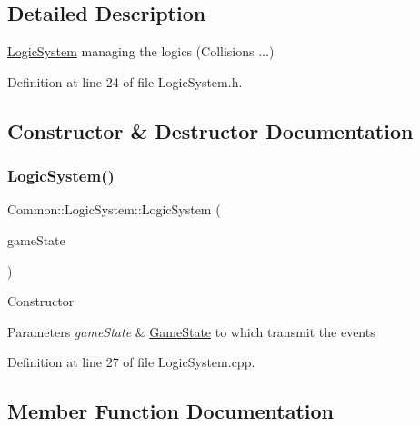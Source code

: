 \subsection{Detailed Description}
\hyperlink{class_common_1_1_logic_system}{Logic\+System} managing the logics (Collisions ...) 

Definition at line 24 of file Logic\+System.\+h.



\subsection{Constructor \& Destructor Documentation}
\mbox{\label{class_common_1_1_logic_system_a414d0489e458dea69dd8386fd556acc2}} 
\subsubsection{\texorpdfstring{Logic\+System()}{LogicSystem()}}
{\footnotesize\ttfamily Common\+::\+Logic\+System\+::\+Logic\+System (\begin{DoxyParamCaption}\item[{\hyperlink{class_common_1_1_game_state}{Game\+State} $\ast$}]{game\+State }\end{DoxyParamCaption})}

Constructor 
\begin{DoxyParams}{Parameters}
{\em game\+State} & \hyperlink{class_common_1_1_game_state}{Game\+State} to which transmit the events \\
\hline
\end{DoxyParams}


Definition at line 27 of file Logic\+System.\+cpp.



\subsection{Member Function Documentation}
\mbox{\label{class_common_1_1_logic_system_a5eb233fa1e610dbf2b52a76d06ce9782}} 
